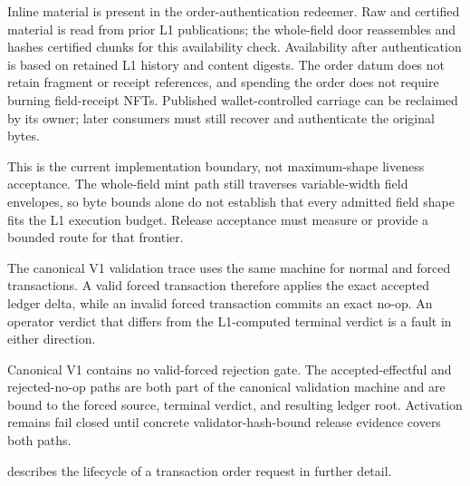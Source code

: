 \documentclass[../midgard.tex]{subfiles}
\begin{document}
Inline material is present in the order-authentication redeemer.
Raw and certified material is read from prior L1 publications; the whole-field door reassembles and hashes certified chunks for this availability check.
Availability after authentication is based on retained L1 history and content digests.
The order datum does not retain fragment or receipt references, and spending the order does not require burning field-receipt NFTs.
Published wallet-controlled carriage can be reclaimed by its owner; later consumers must still recover and authenticate the original bytes.

This is the current implementation boundary, not maximum-shape liveness acceptance.
The whole-field mint path still traverses variable-width field envelopes, so byte bounds alone do not establish that every admitted field shape fits the L1 execution budget.
Release acceptance must measure or provide a bounded route for that frontier.

The canonical V1 validation trace uses the same machine for normal and forced
transactions. A valid forced transaction therefore applies the exact accepted
ledger delta, while an invalid forced transaction commits an exact no-op.
An operator verdict that differs from the L1-computed terminal verdict is a
fault in either direction.

Canonical V1 contains no valid-forced rejection gate. The accepted-effectful
and rejected-no-op paths are both part of the canonical validation machine and
are bound to the forced source, terminal verdict, and resulting ledger root.
Activation remains fail closed until concrete validator-hash-bound release
evidence covers both paths.

 describes the lifecycle of a transaction order request in further detail.
\end{document}
